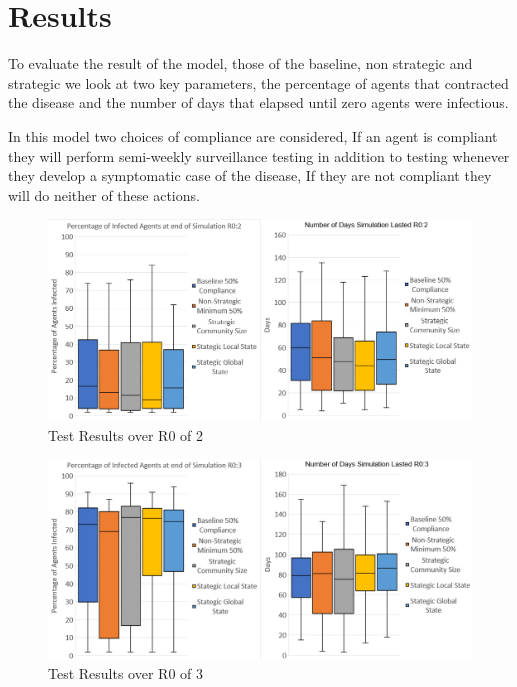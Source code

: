 \documentclass{article}
\begin{document}
\section{Results}

To evaluate the result of the model, those of the baseline, non strategic and strategic we look at two key parameters, the percentage of agents that contracted the disease and the number of days that elapsed until zero agents were infectious.

In this model two choices of compliance are considered, If an agent is compliant they will perform semi-weekly surveillance testing in addition to testing whenever they develop a symptomatic case of the disease, If they are not compliant they will do neither of these actions.


\begin{figure}[h!]
  \centering
      \includegraphics[width=\textwidth]{5}
  \caption{Test Results over R0 of 2}
\end{figure}

\newpage
\begin{figure}[h!]
  \centering
      \includegraphics[width=\textwidth]{4}
  \caption{Test Results over R0 of 3}
\end{figure}
\end{document}
